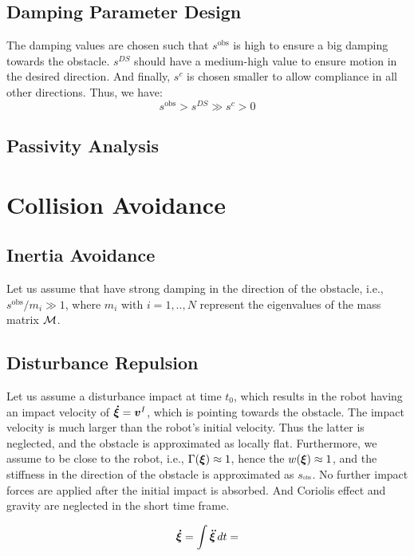 \documentclass[conference]{IEEEtran}
\begin{document}
\subsection{Damping Parameter Design}
The damping values are chosen such that $s^{\mathrm{obs}}$ is high to ensure a big damping towards the obstacle. $s^{DS}$ should have a medium-high value to ensure motion in the desired direction. And finally, $s^{c}$ is chosen smaller to allow compliance in all other directions. Thus, we have:
\begin{equation}
s^{\mathrm{obs}} > s^{DS} \gg s^{c} > 0
\end{equation}

\subsection{Passivity Analysis}


\section{Collision Avoidance}


\subsection{Inertia Avoidance}
Let us assume that have strong damping in the direction of the obstacle, i.e., $s^{\mathrm{obs}} / m_i \gg 1$, where $m_i$ with $i = 1, .., N$ represent the eigenvalues of the mass matrix $\mathcal{M}$. 


\subsection{Disturbance Repulsion}
Let us assume a disturbance impact at time $t_0$, which results in the robot having an impact velocity of $\boldsymbol{\dot \xi} = \boldsymbol{v}^I$, which is pointing towards the obstacle. The impact velocity is much larger than the robot's initial velocity. Thus the latter is neglected, and the obstacle is approximated as locally flat. Furthermore, we assume to be close to the robot, i.e., $\Gamma(\boldsymbol{\xi}) \approx 1$, hence the $w(\boldsymbol{\xi}) \approx 1$, and the stiffness in the direction of the obstacle is approximated as $s_^{\mathrm{obs}}$.
No further impact forces are applied after the initial impact is absorbed. And Coriolis effect and gravity are neglected in the short time frame.

\begin{equation}
    \boldsymbol{\dot \xi} = \int \boldsymbol{\ddot \xi} \, dt = 
\end{equation}
\end{document}
